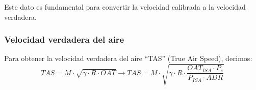 Este dato es fundamental para convertir la velocidad calibrada a la velocidad verdadera.

\subsubsection{Velocidad verdadera del aire}

Para obtener la velocidad verdadera del aire ``TAS'' (True Air Speed), decimos:
\begin{equation}
TAS = M \cdot \sqrt{\gamma \cdot R \cdot OAT} \rightarrow TAS = M \cdot \sqrt{\gamma \cdot R \cdot \frac{OAT_{ISA} \cdot P_e }{P_{ISA} \cdot ADR}}
\label{eq:tas}
\end{equation}
